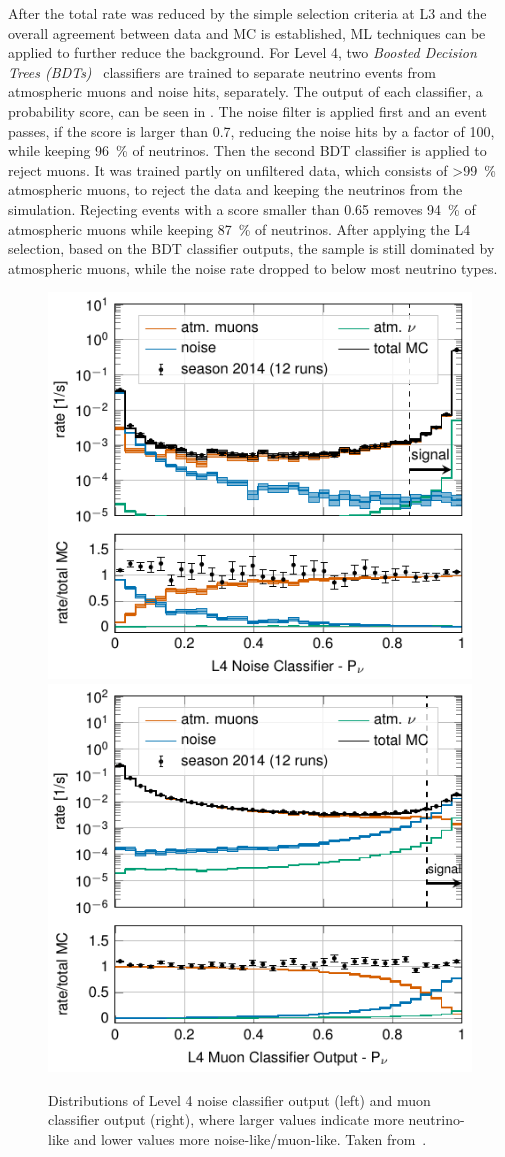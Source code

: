 After the total rate was reduced by the simple selection criteria at L3 and the overall agreement between data and MC is established, ML techniques can be applied to further reduce the background. For Level 4, two \textit{Boosted Decision Trees (BDTs)}~ classifiers are trained to separate neutrino events from atmospheric muons and noise hits, separately. The output of each classifier, a probability score, can be seen in . The noise filter is applied first and an event passes, if the score is larger than 0.7, reducing the noise hits by a factor of 100, while keeping \SI{96}{\percent} of neutrinos. Then the second BDT classifier is applied to reject muons. It was trained partly on unfiltered data, which consists of >\SI{99}{\percent} atmospheric muons, to reject the data and keeping the neutrinos from the simulation. Rejecting events with a score smaller than 0.65 removes \SI{94}{\percent} of atmospheric muons while keeping \SI{87}{\percent} of neutrinos. After applying the L4 selection, based on the BDT classifier outputs, the sample is still dominated by atmospheric muons, while the noise rate dropped to below most neutrino types.

\begin{figure}
\centering 
\includegraphics[width=0.49\linewidth]{figures/simulation_and_processing/selection/l4_noise_classifier_probnu.pdf}
\includegraphics[width=0.49\linewidth]{figures/simulation_and_processing/selection/l4_muon_classifier_probnu.pdf}

\caption[Level 4 classifier outputs (muon and noise)]{Distributions of Level 4 noise classifier output (left) and muon classifier output (right), where larger values indicate more neutrino-like and lower values more noise-like/muon-like. Taken from~\cite{OVS_PRD}.}
\end{figure}



